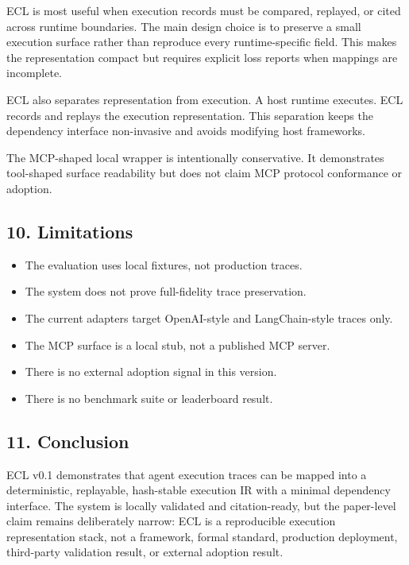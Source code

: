\documentclass[
]{article}
\providecommand{\tightlist}{%
  \setlength{\itemsep}{0pt}\setlength{\parskip}{0pt}}
\begin{document}
ECL is most useful when execution records must be compared, replayed, or
cited across runtime boundaries. The main design choice is to preserve a
small execution surface rather than reproduce every runtime-specific
field. This makes the representation compact but requires explicit loss
reports when mappings are incomplete.

ECL also separates representation from execution. A host runtime
executes. ECL records and replays the execution representation. This
separation keeps the dependency interface non-invasive and avoids
modifying host frameworks.

The MCP-shaped local wrapper is intentionally conservative. It
demonstrates tool-shaped surface readability but does not claim MCP
protocol conformance or adoption.

\subsection{10. Limitations}\label{limitations}

\begin{itemize}
\tightlist
\item
  The evaluation uses local fixtures, not production traces.
\item
  The system does not prove full-fidelity trace preservation.
\item
  The current adapters target OpenAI-style and LangChain-style traces
  only.
\item
  The MCP surface is a local stub, not a published MCP server.
\item
  There is no external adoption signal in this version.
\item
  There is no benchmark suite or leaderboard result.
\end{itemize}

\subsection{11. Conclusion}\label{conclusion}

ECL v0.1 demonstrates that agent execution traces can be mapped into a
deterministic, replayable, hash-stable execution IR with a minimal
dependency interface. The system is locally validated and
citation-ready, but the paper-level claim remains deliberately narrow:
ECL is a reproducible execution representation stack, not a framework,
formal standard, production deployment, third-party validation result,
or external adoption result.
\end{document}
